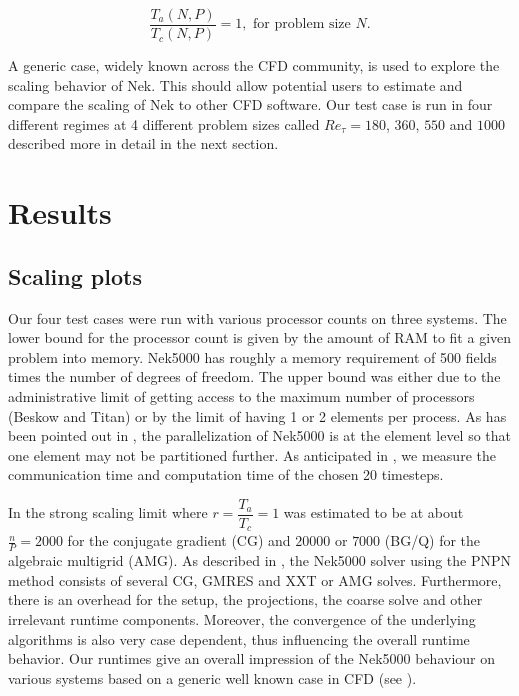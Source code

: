\documentclass{sig-alternate}
\begin{document}
\begin{equation}
  \dfrac{T_a(N,P)}{T_c(N,P)}=1,\mbox{ for problem size }N.
  \label{eq:strong}
\end{equation} 

A generic case, widely known across the CFD community, is used to explore the
scaling behavior of Nek. This should allow potential users to estimate and
compare the scaling of Nek to other CFD software.
Our test case is run in four different regimes at 4 different problem sizes called
$Re_{\tau} = 180$, $360$, $550$ and $1000$ described more in
detail in the next section.

\section{Results}

\subsection{Scaling plots}

Our four test cases were run with various processor counts on three systems. The
lower bound for the processor count is given by the amount of RAM to fit a given
problem into memory. Nek5000 has roughly a memory requirement of 500 fields
times the number of degrees of freedom. The upper bound was either due to the
administrative limit of getting access to the maximum number of processors
(Beskow and Titan) or by the limit of having 1 or 2 elements per process. As has
been pointed out in , the parallelization of Nek5000 is at the
element level so that one element may not be partitioned further. 
As anticipated in , we measure the communication time and
computation time of the chosen 20 timesteps. 

In \cite{fischer:scaling} the strong scaling limit where $r=\dfrac{T_a}{T_c}=1$ was estimated
to be at about $\frac{n}{P}=2000$ for the conjugate gradient (CG) and $20000$ or
$7000$ (BG/Q) for the algebraic multigrid (AMG). As described in , the
Nek5000 solver using the PNPN method consists of several CG, GMRES and XXT or AMG solves. Furthermore,
there is an overhead for the setup, the projections, the coarse solve and other
irrelevant runtime components. Moreover, the convergence of the underlying
algorithms is also very case dependent, thus influencing the overall runtime
behavior. Our runtimes give an overall impression of the Nek5000 behaviour on
various systems based on a generic well known case in CFD (see
). 
\end{document}
